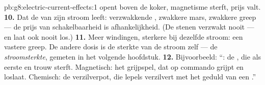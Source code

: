 \begin{solution}{pb:g8:electric-current-effects:1}
 opent boven de koker, magnetisme sterft, prijs valt.
\textbf{10.} Dat de  van zijn stroom leeft:
verzwakkende , zwakkere mars, zwakkere greep --- de prijs
van schakelbaarheid is afhankelijkheid. (De stenen
 verzwakt nooit --- en laat ook nooit los.)
\textbf{11.} Meer windingen, sterkere  bij dezelfde stroom:
een vastere greep. De andere dosis is de sterkte van de stroom zelf ---
de \emph{stroomsterkte}, gemeten in het volgende hoofdstuk.
\textbf{12.} Bijvoorbeeld: ``: de , die als eerste
en trouw sterft. Magnetisch: het grijpspel, dat op commando grijpt en
loslaat. Chemisch: de verzilverpot, die lepels verzilvert met het
geduld van een .''
\end{solution}
